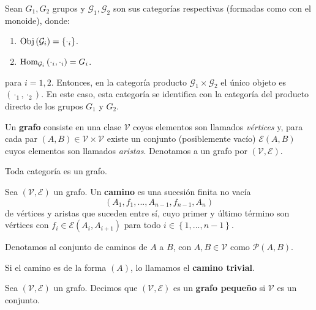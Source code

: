 \documentclass[12pt]{report}
\theoremstyle{largebreak}
\newcommand{\Obj}[1]{\ensuremath{\textup{Obj}\left(#1\right)}}
\newcommand{\Hom}[3]{\ensuremath{\textup{Hom}_{#1}\left(#2,#3\right)}}
\begin{document}
    \begin{exa}
        Sean $G_1,G_2$ grupos y $\mathcal{G}_1,\mathcal{G}_2$ son sus categorías respectivas (formadas como con el monoide), donde:
        \begin{enumerate}
            \item $\Obj{\mathcal{G}_i}=\left\{\cdot_i \right\}$.
            \item $\Hom{\mathcal{G}_i}{\cdot_i}{\cdot_i}=G_i$.
        \end{enumerate}
        para $i=1,2$. Entonces, en la categoría producto $\mathcal{G}_1\times\mathcal{G}_2$ el único objeto es $(\cdot_1,\cdot_2)$. En este caso, esta categoría se identifica con la categoría del producto directo de los grupos $G_1$ y $G_2$.
    \end{exa}

    \begin{mydef}
        Un \textbf{grafo} consiste en una clase $\mathcal{V}$ coyos elementos son llamados \textit{vértices} y, para cada par $(A,B)\in\mathcal{V}\times\mathcal{V}$ existe un conjunto (posiblemente vacío) $\mathcal{E}(A,B)$ cuyos elementos son llamados \textit{aristas}. Denotamos a un grafo por $(\mathcal{V},\mathcal{E})$.
    \end{mydef}

    \begin{obs}
        Toda categoría es un grafo.
    \end{obs}

    \begin{mydef}
        Sea $(\mathcal{V},\mathcal{E})$ un grafo. Un \textbf{camino} es una sucesión finita no vacía
        \begin{equation*}
            \left(A_1,f_1,...,A_{n-1},f_{n-1},A_n \right)
        \end{equation*}
        de vértices y aristas que suceden entre sí, cuyo primer y último término son vértices con $f_i\in\mathcal{E}(A_i,A_{i+1})$ para todo $i\in\left\{1,...,n-1 \right\}$.

        Denotamos al conjunto de caminos de $A$ a $B$, con $A,B\in\mathcal{V}$ como $\mathcal{P}(A,B)$.
    \end{mydef}

    \begin{obs}
        Si el camino es de la forma $(A)$, lo llamamos el \textbf{camino trivial}.
    \end{obs}

    \begin{mydef}
        Sea $(\mathcal{V},\mathcal{E})$ un grafo. Decimos que $(\mathcal{V},\mathcal{E})$ es un \textbf{grafo pequeño} si $\mathcal{V}$ es un conjunto.
    \end{mydef}
\end{document}

